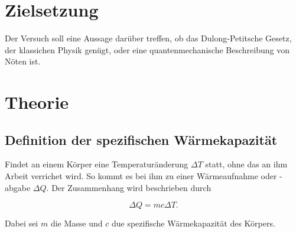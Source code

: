 \section*{Zielsetzung}
Der Versuch soll eine Aussage darüber treffen, ob das Dulong-Petitsche Gesetz, der klassichen Physik genügt, oder
eine quantenmechanische Beschreibung von Nöten ist.

\section{Theorie}

\subsection{Definition der spezifischen Wärmekapazität}

Findet an einem Körper eine Temperaturänderung $\Delta T$ statt, ohne das an ihm 
Arbeit verrichet wird. So kommt es bei ihm zu einer Wärmeaufnahme oder -abgabe $\Delta Q$.
Der Zusammenhang wird beschrieben durch

\begin{equation*}
\Delta Q=m c \Delta T.
\end{equation*}

Dabei sei $m$ die Masse und $c$ due spezifische Wärmekapazität 
des Körpers.







